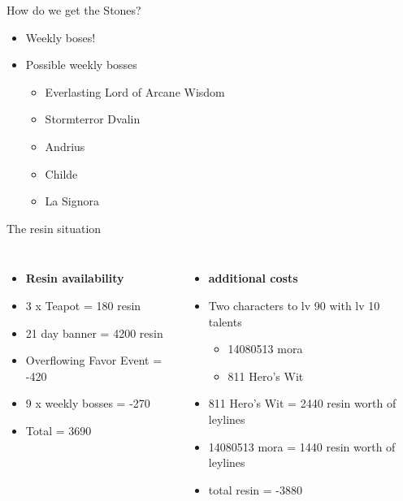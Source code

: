 \documentclass{beamer}
\begin{document}
\begin{frame}{How do we get the Stones?}
    \begin{itemize}
        \pause 
        \item Weekly boses! 
        \pause
        \item Possible weekly bosses
        \pause 
            \begin{itemize}
                \item Everlasting Lord of Arcane Wisdom
                \pause
                \item Stormterror Dvalin
                \pause
                \item Andrius
                \pause
                \item Childe
                \pause
                \item La Signora
            \end{itemize}
    \end{itemize}
\pause 

\end{frame}


\begin{frame}{The resin situation}
\begin{columns}
\begin{itemize}
    \pause 
    \item \textbf{Resin availability}
    \pause
    \item 3 x Teapot = 180 resin
    \pause 
    \item 21 day banner = 4200 resin 
    \pause 
    \item Overflowing Favor Event = -420 
    \pause 
    \item 9 x weekly bosses = -270
    \pause 
    \item Total = 3690
\end{itemize}      
    \begin{itemize}
        \pause 
        \item\textbf{additional costs}
        \pause 
        \item Two characters to lv 90 with lv 10 talents
            \begin{itemize}
                \item 14080513 mora 
                \item 811 Hero's Wit
            \end{itemize} 
        \pause 
        \item 811 Hero's Wit = 2440 resin worth of leylines
        \pause 
        \item 14080513 mora = 1440 resin worth of leylines 
        \pause 
        \item total resin = -3880 
    \end{itemize}
\pause 

\end{columns}
\end{frame}
\end{document}
